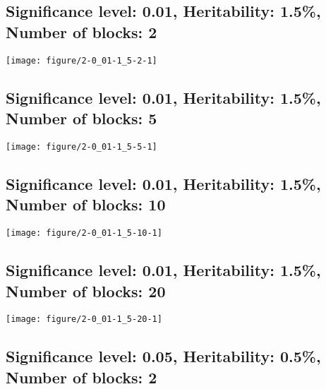 \documentclass[11pt,letter]{article}\usepackage[]{graphicx}\usepackage[]{color}
\makeatletter
\def\maxwidth{ %
  \ifdim\Gin@nat@width>\linewidth
    \linewidth
  \else
    \Gin@nat@width
  \fi
}
\newenvironment{knitrout}{}{} %
\makeatother
\begin{document}
\newpage
\subsection{Significance level: 0.01, Heritability: 1.5\%, Number of blocks: 2}

\begin{knitrout}
\color{fgcolor}
\texttt{[image: figure/2-0\_01-1\_5-2-1]} 

\end{knitrout}

\newpage
\subsection{Significance level: 0.01, Heritability: 1.5\%, Number of blocks: 5}

\begin{knitrout}
\color{fgcolor}
\texttt{[image: figure/2-0\_01-1\_5-5-1]} 

\end{knitrout}

\newpage
\subsection{Significance level: 0.01, Heritability: 1.5\%, Number of blocks: 10}

\begin{knitrout}
\color{fgcolor}
\texttt{[image: figure/2-0\_01-1\_5-10-1]} 

\end{knitrout}

\newpage
\subsection{Significance level: 0.01, Heritability: 1.5\%, Number of blocks: 20}

\begin{knitrout}
\color{fgcolor}
\texttt{[image: figure/2-0\_01-1\_5-20-1]} 

\end{knitrout}

\newpage
\subsection{Significance level: 0.05, Heritability: 0.5\%, Number of blocks: 2}
\end{document}

